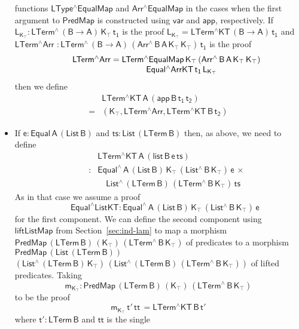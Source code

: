 \documentclass[sigplan,10pt]{acmart}
\begin{document}
\begin{itemize}
  functions $\mathsf{LType^\wedge EqualMap}$ and $\mathsf{Arr^\wedge
    EqualMap}$ in the cases when the first argument to
  $\mathsf{PredMap}$ is constructed using $\mathsf{var}$ and
  $\mathsf{app}$, respectively. If $\mathsf{L_{K_\top} :
    LTerm^{\wedge}\, (B \to A) \, K_\top\, t_1}$ is the proof
  $\mathsf{L_{K_\top} = LTerm^\wedge KT\, (B \to A)\, t_1}$ and
  $\mathsf{ LTerm^\wedge Arr}$ $\mathsf{: LTerm^{\wedge}\, (B \to A)\,
    (Arr^{\wedge} \, B\, A\, K_\top \, K_\top)\, t_1}$ is the proof
  \[\begin{array}{l}
   \quad\quad  \mathsf{LTerm^\wedge Arr = LTerm^\wedge
    EqualMap\,K_\top\,(Arr^{\wedge}\,B\,A\,K_\top\,K_\top)}\\
  \hspace*{1.5in} \mathsf{Equal^\wedge ArrKT\, t_1\, L_{K_\top}}
  \end{array}\]
  then we define
  \[\begin{array}{ll}
    & \mathsf{LTerm^\wedge KT\,A\, (app\, B\, t_1\, t_2)} \\
  = & \mathsf{(K_\top ,  LTerm^\wedge Arr , LTerm^\wedge KT\,B\,t_2)}
    \end{array}\]
\item If $\mathsf{e : Equal\,A\,(List\,B)}$ and $\mathsf{ts :
  List\,(LTerm\, B)}$ then, as above, we need to define
  \[\begin{array}{ll}
  & \!\!\mathsf{LTerm^\wedge KT\,A\, (list\, B \,e\, ts)}\\
\quad\quad : & \!\!\mathsf{Equal^{\wedge} \, A\, (List\,B)\, K_\top\,
  (List^{\wedge} \, B\, K_\top) \, e\, \times}\\
 & \quad\mathsf{List^{\wedge}\, (LTerm\,B)
  \, (LTerm^{\wedge} \, B\, K_\top) \, ts }
  \end{array}\]
  As in that case we assume a proof
  \[\;\;\quad\mathsf{Equal^\wedge ListKT : Equal^{\wedge} \, A\, (List\,B)\, K_\top\,
  (List^{\wedge} \, B\, K_\top) \, e}\] for the first component.  We
  can define the second component using $\mathsf{liftListMap}$ from
  Section~\ref{sec:ind-lam} to map a morphism $\mathsf{PredMap\,
    (LTerm\,B)\, (K_\top)\, (LTerm^{\wedge}\,B\,K_\top)}$ of
  predicates to a morphism $\mathsf{PredMap\,(List\,(LTerm\,B))}$
  $\mathsf{(List^{\wedge}\,(LTerm\,B)\,K_\top) \,
    (List^{\wedge}\,(LTerm\,B)\, (LTerm^{\wedge}\,B\,K_\top))}$ of
  lifted predicates.  Taking
  \[\mathsf{m_{K_\top} : PredMap\,
    (LTerm\,B) \, (K_\top)\, (LTerm^{\wedge}\,B\,K_\top)}\] to be the
  proof \[\mathsf{m_{K_\top} \, t'\, tt\, = LTerm^\wedge KT\, B\, t'}\]
  where $\mathsf{t' : LTerm\,B}$ and $\mathsf{tt}$ is the single

\end{itemize}
\end{document}
